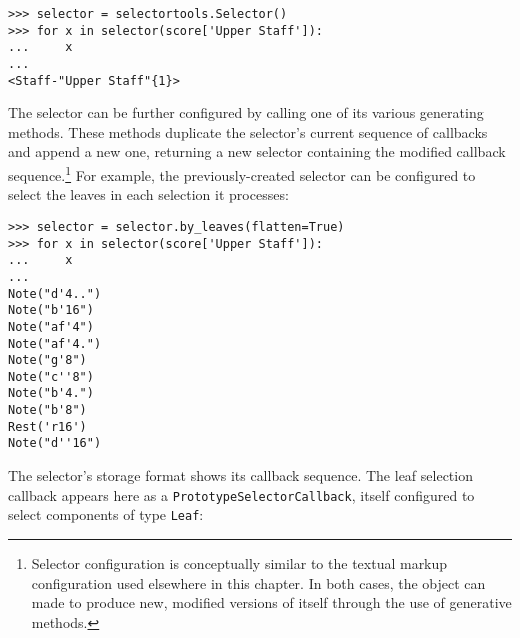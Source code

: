 \begin{comment}
<abjad>
selector = selectortools.Selector()
for x in selector(score['Upper Staff']):
    x

</abjad>
\end{comment}

\begin{abjadbookoutput}
\begin{singlespacing}
\vspace{-0.5\baselineskip}
\begin{lstlisting}
>>> selector = selectortools.Selector()
>>> for x in selector(score['Upper Staff']):
...     x
...
<Staff-"Upper Staff"{1}>
\end{lstlisting}
\end{singlespacing}
\end{abjadbookoutput}

\noindent The selector can be further configured by calling one of its various
generating methods. These methods duplicate the selector's current sequence of
callbacks and append a new one, returning a new selector containing the
modified callback sequence.\footnote{Selector configuration is conceptually
similar to the textual markup configuration used elsewhere in this chapter. In
both cases, the object can made to produce new, modified versions of itself
through the use of generative methods.} For example, the previously-created
selector can be configured to select the leaves in each selection it processes:

\begin{comment}
<abjad>
selector = selector.by_leaves(flatten=True)
for x in selector(score['Upper Staff']):
    x

</abjad>
\end{comment}

\begin{abjadbookoutput}
\begin{singlespacing}
\vspace{-0.5\baselineskip}
\begin{lstlisting}
>>> selector = selector.by_leaves(flatten=True)
>>> for x in selector(score['Upper Staff']):
...     x
...
Note("d'4..")
Note("b'16")
Note("af'4")
Note("af'4.")
Note("g'8")
Note("c''8")
Note("b'4.")
Note("b'8")
Rest('r16')
Note("d''16")
\end{lstlisting}
\end{singlespacing}
\end{abjadbookoutput}

\noindent The selector's storage format shows its callback sequence. The leaf
selection callback appears here as a \texttt{PrototypeSelectorCallback}, itself
configured to select components of type \texttt{Leaf}:

